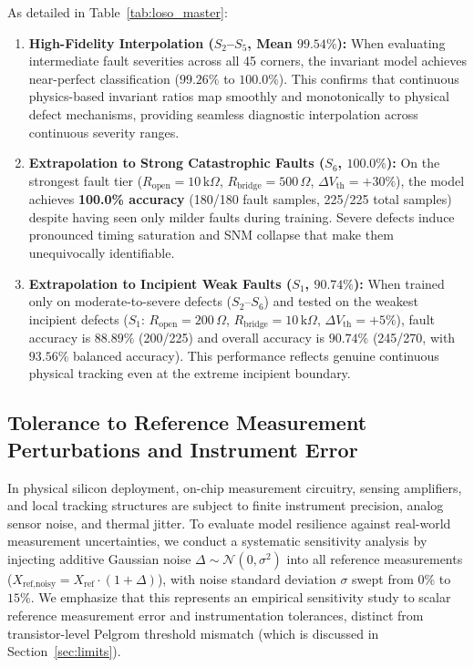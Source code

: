 \documentclass[conference]{IEEEtran}
\begin{document}
As detailed in Table~\ref{tab:loso_master}:
\begin{enumerate}
    \item \textbf{High-Fidelity Interpolation ($S_2$–$S_5$, Mean $99.54\%$):} When evaluating intermediate fault severities across all 45 corners, the invariant model achieves near-perfect classification ($99.26\%$ to $100.0\%$). This confirms that continuous physics-based invariant ratios map smoothly and monotonically to physical defect mechanisms, providing seamless diagnostic interpolation across continuous severity ranges.
    \item \textbf{Extrapolation to Strong Catastrophic Faults ($S_6$, $100.0\%$):} On the strongest fault tier ($R_{\text{open}} = 10\,\text{k}\Omega$, $R_{\text{bridge}} = 500\,\Omega$, $\Delta V_{\text{th}} = +30\%$), the model achieves \textbf{100.0\% accuracy} (180/180 fault samples, 225/225 total samples) despite having seen only milder faults during training. Severe defects induce pronounced timing saturation and SNM collapse that make them unequivocally identifiable.
    \item \textbf{Extrapolation to Incipient Weak Faults ($S_1$, $90.74\%$):} When trained only on moderate-to-severe defects ($S_2$–$S_6$) and tested on the weakest incipient defects ($S_1$: $R_{\text{open}} = 200\,\Omega$, $R_{\text{bridge}} = 10\,\text{k}\Omega$, $\Delta V_{\text{th}} = +5\%$), fault accuracy is $88.89\%$ (200/225) and overall accuracy is $90.74\%$ (245/270, with $93.56\%$ balanced accuracy). This performance reflects genuine continuous physical tracking even at the extreme incipient boundary.
\end{enumerate}

\subsection{Tolerance to Reference Measurement Perturbations and Instrument Error}
\label{sec:tolerance}
In physical silicon deployment, on-chip measurement circuitry, sensing amplifiers, and local tracking structures are subject to finite instrument precision, analog sensor noise, and thermal jitter. To evaluate model resilience against real-world measurement uncertainties, we conduct a systematic sensitivity analysis by injecting additive Gaussian noise $\Delta \sim \mathcal{N}(0, \sigma^2)$ into all reference measurements ($X_{\text{ref,noisy}} = X_{\text{ref}} \cdot (1 + \Delta)$), with noise standard deviation $\sigma$ swept from $0\%$ to $15\%$. We emphasize that this represents an empirical sensitivity study to scalar reference measurement error and instrumentation tolerances, distinct from transistor-level Pelgrom threshold mismatch (which is discussed in Section~\ref{sec:limits}).
\end{document}

